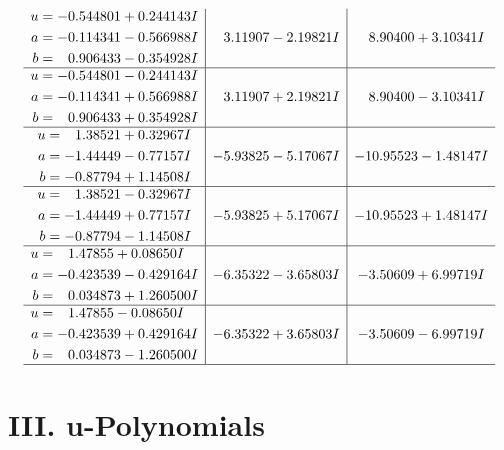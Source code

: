 \documentclass[1p]{elsarticle_modified}
\theoremstyle{definition}
\begin{document}
$$\begin{array}{c|c|c}
\begin{aligned}
u &= -0.544801 + 0.244143 I \\
a &= -0.114341 - 0.566988 I \\
b &= \phantom{-}0.906433 - 0.354928 I\end{aligned}
 & \phantom{-}3.11907 - 2.19821 I & \phantom{-}8.90400 + 3.10341 I \\ \hline\begin{aligned}
u &= -0.544801 - 0.244143 I \\
a &= -0.114341 + 0.566988 I \\
b &= \phantom{-}0.906433 + 0.354928 I\end{aligned}
 & \phantom{-}3.11907 + 2.19821 I & \phantom{-}8.90400 - 3.10341 I \\ \hline\begin{aligned}
u &= \phantom{-}1.38521 + 0.32967 I \\
a &= -1.44449 - 0.77157 I \\
b &= -0.87794 + 1.14508 I\end{aligned}
 & -5.93825 - 5.17067 I & -10.95523 - 1.48147 I \\ \hline\begin{aligned}
u &= \phantom{-}1.38521 - 0.32967 I \\
a &= -1.44449 + 0.77157 I \\
b &= -0.87794 - 1.14508 I\end{aligned}
 & -5.93825 + 5.17067 I & -10.95523 + 1.48147 I \\ \hline\begin{aligned}
u &= \phantom{-}1.47855 + 0.08650 I \\
a &= -0.423539 - 0.429164 I \\
b &= \phantom{-}0.034873 + 1.260500 I\end{aligned}
 & -6.35322 - 3.65803 I & -3.50609 + 6.99719 I \\ \hline\begin{aligned}
u &= \phantom{-}1.47855 - 0.08650 I \\
a &= -0.423539 + 0.429164 I \\
b &= \phantom{-}0.034873 - 1.260500 I\end{aligned}
 & -6.35322 + 3.65803 I & -3.50609 - 6.99719 I\\
 \hline 
 \end{array}$$\newpage
\newpage\renewcommand{\arraystretch}{1}
\centering \section*{ III. u-Polynomials}
\end{document}
